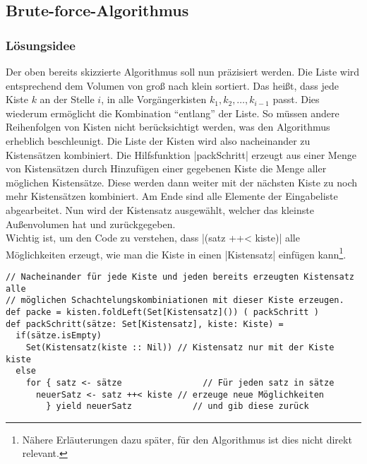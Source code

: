 \subsection{Brute-force-Algorithmus}
\label{bruteforce}
\subsubsection{Lösungsidee}
\lstset{basicstyle=\ttfamily}
 Der oben bereits skizzierte Algorithmus soll nun präzisiert werden.
 Die Liste wird entsprechend dem Volumen von groß nach klein sortiert.
 Das heißt, dass jede Kiste $k$ an der Stelle $i$, in alle Vorgängerkisten $k_1, k_2, \dots, k_{i-1}$ passt.
 Dies wiederum ermöglicht die Kombination ``entlang'' der Liste.
 So müssen andere Reihenfolgen von Kisten nicht berücksichtigt werden, was den Algorithmus erheblich beschleunigt.
 Die Liste der Kisten wird also nacheinander zu Kistensätzen kombiniert.
 Die Hilfsfunktion |packSchritt| erzeugt aus einer Menge von Kistensätzen durch Hinzufügen einer gegebenen Kiste die Menge aller möglichen Kistensätze.
 Diese werden dann weiter mit der nächsten Kiste zu noch mehr Kistensätzen kombiniert.
 Am Ende sind alle Elemente der Eingabeliste abgearbeitet.
 Nun wird der Kistensatz ausgewählt, welcher das kleinste Außenvolumen hat und zurückgegeben. \\
 Wichtig ist, um den Code zu verstehen, dass |(satz ++< kiste)| alle Möglichkeiten erzeugt,
 wie man die Kiste in einen |Kistensatz| einfügen kann\footnote{Nähere Erläuterungen dazu später, für den Algorithmus ist dies nicht direkt relevant.}.
\\
\lstset{basicstyle=\ttfamily\small}
\begin{lstlisting}
// Nacheinander für jede Kiste und jeden bereits erzeugten Kistensatz alle
// möglichen Schachtelungskombiniationen mit dieser Kiste erzeugen.
def packe = kisten.foldLeft(Set[Kistensatz]()) ( packSchritt )
def packSchritt(sätze: Set[Kistensatz], kiste: Kiste) =
  if(sätze.isEmpty)
    Set(Kistensatz(kiste :: Nil)) // Kistensatz nur mit der Kiste kiste
  else
    for { satz <- sätze                // Für jeden satz in sätze
	  neuerSatz <- satz ++< kiste // erzeuge neue Möglichkeiten
        } yield neuerSatz            // und gib diese zurück
\end{lstlisting}
\lstset{basicstyle=\ttfamily}
